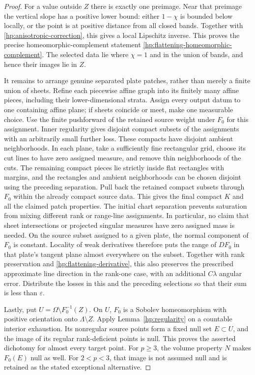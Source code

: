 \documentclass[11pt]{article}
\numberwithin{equation}{section}
\theoremstyle{definition}
\theoremstyle{remark}
\begin{document}
\begin{proof}
For a value outside $Z$ there is exactly one preimage.  Near that
preimage the vertical slope has a positive lower bound: either
$1-\chi$ is bounded below locally, or the point is at positive
distance from all closed bands.  Together with
\eqref{hp:anisotropic-correction}, this gives a local Lipschitz
inverse.  This proves the precise homeomorphic-complement statement
\eqref{hp:flattening-homeomorphic-complement}.  The selected data
lie where $\chi=1$ and in the union of bands, and hence their images
lie in $Z$.

It remains to arrange genuine separated plate patches, rather than
merely a finite union of sheets.  Refine each piecewise affine graph
into its finitely many affine pieces, including their lower-dimensional
strata.  Assign every output datum to one containing affine plane;
if sheets coincide or meet, make one measurable choice.  Use the
finite pushforward of the retained source weight under $F_0$ for
this assignment.  Inner regularity gives disjoint compact subsets
of the assignments with an arbitrarily small further loss.  These
compacts have disjoint ambient neighborhoods.  In each plane, take
a sufficiently fine rectangular grid, choose its cut lines to have
zero assigned measure, and remove thin neighborhoods of the cuts.
The remaining compact pieces lie strictly inside flat rectangles
with margins, and the rectangles and ambient neighborhoods can be
chosen disjoint using the preceding separation.  Pull back the
retained compact subsets through $F_0$ within the already compact
source data.  This gives the final compact $K$ and all the claimed
patch properties.  The initial chart separation prevents saturation
from mixing different rank or range-line assignments.  In particular,
no claim that sheet intersections or projected singular measures
have zero assigned mass is needed.  On the source subset assigned
to a given plate, the normal component of $F_0$ is constant.
Locality of weak derivatives therefore puts the range of $DF_0$
in that plate's tangent plane almost everywhere on the subset.
Together with rank preservation and
\eqref{hp:flattening-derivative}, this also preserves the prescribed
approximate line direction in the rank-one case, with an additional
$C\lambda$ angular error.  Distribute the losses in this
and the preceding selections so that their sum is less than $\varepsilon$.

Lastly, put $U=\Omega\setminus F_0^{-1}(Z)$.  On $U$, $F_0$ is a
Sobolev homeomorphism with positive orientation onto
$\Lambda\setminus Z$.  Apply Lemma~\ref{hp:regularity} on a
countable interior exhaustion.  Its nonregular source points form
a fixed null set $E\subset U$, and the image of its regular
rank-deficient points is null.  This proves the asserted dichotomy
for almost every target point.  For $p\ge3$, the volume property
$N$ makes $F_0(E)$ null as well.  For $2<p<3$, that image is not
assumed null and is retained as the stated exceptional alternative.
\end{proof}
\end{document}
